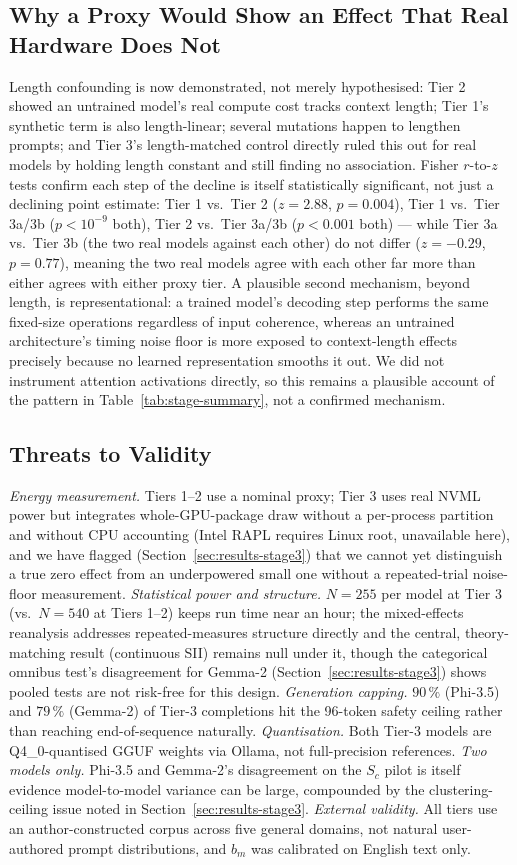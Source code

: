 \documentclass[conference]{IEEEtran}
\begin{document}
\subsection{Why a Proxy Would Show an Effect That Real Hardware Does Not}
\label{sec:why}
Length confounding is now demonstrated, not merely hypothesised: Tier
2 showed an untrained model's real compute cost tracks context length;
Tier 1's synthetic term is also length-linear; several mutations
happen to lengthen prompts; and Tier 3's length-matched control
directly ruled this out for real models by holding length constant and
still finding no association. Fisher $r$-to-$z$ tests confirm each
step of the decline is itself statistically significant, not just a
declining point estimate: Tier 1 vs.\ Tier 2 ($z=2.88$, $p=0.004$),
Tier 1 vs.\ Tier 3a/3b ($p<10^{-9}$ both), Tier 2 vs.\ Tier 3a/3b
($p<0.001$ both) --- while Tier 3a vs.\ Tier 3b (the two real models
against each other) do not differ ($z=-0.29$, $p=0.77$), meaning the
two real models agree with each other far more than either agrees with
either proxy tier. A plausible second mechanism, beyond length, is
representational: a trained model's decoding step performs the same
fixed-size operations regardless of input coherence, whereas an
untrained architecture's timing noise floor is more exposed to
context-length effects precisely because no learned representation
smooths it out. We did not instrument attention activations directly,
so this remains a plausible account of the pattern in
Table~\ref{tab:stage-summary}, not a confirmed mechanism.
\subsection{Threats to Validity}
\label{sec:limits}
\emph{Energy measurement.} Tiers 1--2 use a nominal proxy; Tier 3 uses
real NVML power but integrates whole-GPU-package draw without a
per-process partition and without CPU accounting (Intel RAPL requires
Linux root, unavailable here), and we have flagged
(Section~\ref{sec:results-stage3}) that we cannot yet distinguish a
true zero effect from an underpowered small one without a
repeated-trial noise-floor measurement. \emph{Statistical power and
structure.} $N=255$ per model at Tier 3 (vs.\ $N=540$ at Tiers 1--2)
keeps run time near an hour; the mixed-effects reanalysis addresses
repeated-measures structure directly and the central, theory-matching
result (continuous SII) remains null under it, though the categorical
omnibus test's disagreement for Gemma-2 (Section~\ref{sec:results-stage3})
shows pooled tests are not risk-free for this design. \emph{Generation
capping.} $90\,\%$ (Phi-3.5) and $79\,\%$ (Gemma-2) of Tier-3
completions hit the 96-token safety ceiling rather than reaching
end-of-sequence naturally. \emph{Quantisation.} Both Tier-3 models are
Q4\_0-quantised GGUF weights via Ollama, not full-precision references.
\emph{Two models only.} Phi-3.5 and Gemma-2's disagreement on the
$S_c$ pilot is itself evidence model-to-model variance can be large,
compounded by the clustering-ceiling issue noted in
Section~\ref{sec:results-stage3}. \emph{External validity.} All
tiers use an author-constructed corpus across five general domains,
not natural user-authored prompt distributions, and $b_m$ was
calibrated on English text only.
\end{document}
